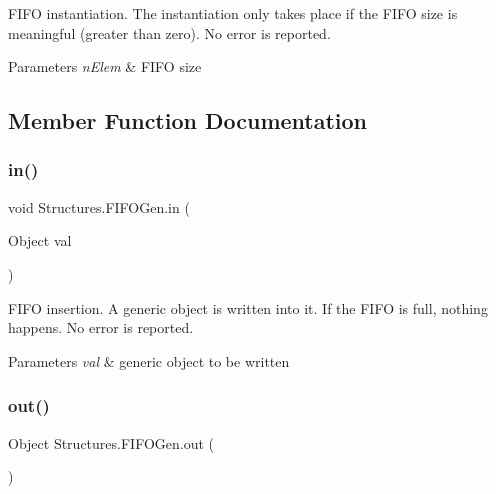 F\+I\+FO instantiation. The instantiation only takes place if the F\+I\+FO size is meaningful (greater than zero). No error is reported.


\begin{DoxyParams}{Parameters}
{\em n\+Elem} & F\+I\+FO size \\
\hline
\end{DoxyParams}


\subsection{Member Function Documentation}
\mbox{\label{class_structures_1_1_f_i_f_o_gen_a8ec114330d8c542df57d58886ecb2196}} 
\subsubsection{\texorpdfstring{in()}{in()}}
{\footnotesize\ttfamily void Structures.\+F\+I\+F\+O\+Gen.\+in (\begin{DoxyParamCaption}\item[{Object}]{val }\end{DoxyParamCaption})\hspace{0.3cm}{\ttfamily [inline]}}

F\+I\+FO insertion. A generic object is written into it. If the F\+I\+FO is full, nothing happens. No error is reported.


\begin{DoxyParams}{Parameters}
{\em val} & generic object to be written \\
\hline
\end{DoxyParams}
\mbox{\label{class_structures_1_1_f_i_f_o_gen_ac21638f2f22f36450c241d5f5dc665bb}} 
\subsubsection{\texorpdfstring{out()}{out()}}
{\footnotesize\ttfamily Object Structures.\+F\+I\+F\+O\+Gen.\+out (\begin{DoxyParamCaption}{ }\end{DoxyParamCaption})\hspace{0.3cm}{\ttfamily [inline]}}

